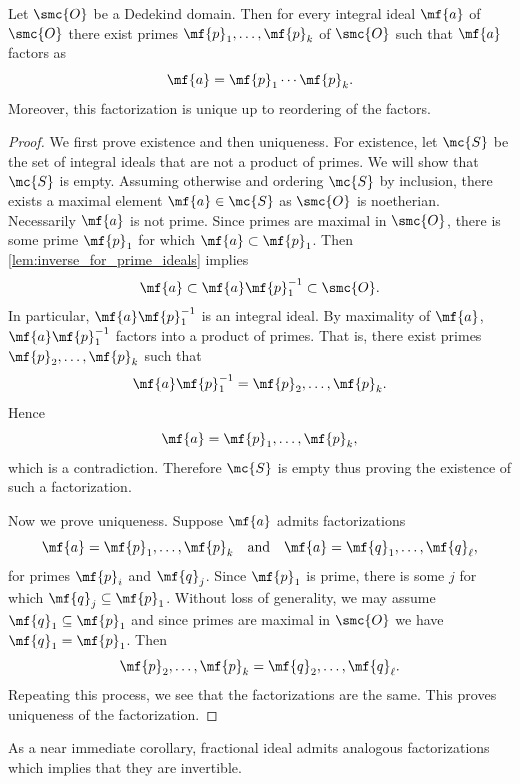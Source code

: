     \begin{theorem}\label{thm:unique_product_prime_ideals}
      Let \(\smc{O}\) be a Dedekind domain. Then for every integral ideal \(\mf{a}\) of \(\smc{O}\) there exist primes \(\mf{p}_{1},\ldots,\mf{p}_{k}\) of \(\smc{O}\) such that \(\mf{a}\) factors as
      \[
        \mf{a} = \mf{p}_{1} \cdots \mf{p}_{k}.
      \]
      Moreover, this factorization is unique up to reordering of the factors.
    \end{theorem}
    \begin{proof}
      We first prove existence and then uniqueness. For existence, let \(\mc{S}\) be the set of integral ideals that are not a product of primes. We will show that \(\mc{S}\) is empty. Assuming otherwise and ordering \(\mc{S}\) by inclusion, there exists a maximal element \(\mf{a} \in \mc{S}\) as \(\smc{O}\) is noetherian. Necessarily \(\mf{a}\) is not prime. Since primes are maximal in \(\smc{O}\), there is some prime \(\mf{p}_{1}\) for which \(\mf{a} \subset \mf{p}_{1}\). Then \cref{lem:inverse_for_prime_ideals} implies
      \[
        \mf{a} \subset \mf{a}\mf{p}_{1}^{-1} \subset \smc{O}.
      \]
      In particular, \(\mf{a}\mf{p}_{1}^{-1}\) is an integral ideal. By maximality of \(\mf{a}\), \(\mf{a}\mf{p}_{1}^{-1}\) factors into a product of primes. That is, there exist primes \(\mf{p}_{2},\ldots,\mf{p}_{k}\) such that
      \[
        \mf{a}\mf{p}_{1}^{-1} = \mf{p}_{2},\ldots,\mf{p}_{k}.
      \]
      Hence
      \[
        \mf{a} = \mf{p}_{1},\ldots,\mf{p}_{k},
      \]
      which is a contradiction. Therefore \(\mc{S}\) is empty thus proving the existence of such a factorization.
      
      Now we prove uniqueness. Suppose \(\mf{a}\) admits factorizations
      \[
        \mf{a} = \mf{p}_{1},\ldots,\mf{p}_{k} \quad \text{and} \quad \mf{a} = \mf{q}_{1},\ldots,\mf{q}_{\ell},
      \]
      for primes \(\mf{p}_{i}\) and \(\mf{q}_{j}\). Since \(\mf{p}_{1}\) is prime, there is some \(j\) for which \(\mf{q}_{j} \subseteq \mf{p}_{1}\). Without loss of generality, we may assume \(\mf{q}_{1} \subseteq \mf{p}_{1}\) and since primes are maximal in \(\smc{O}\) we have \(\mf{q}_{1} = \mf{p}_{1}\). Then
      \[
        \mf{p}_{2},\ldots,\mf{p}_{k} = \mf{q}_{2},\ldots,\mf{q}_{\ell}.
      \]
      Repeating this process, we see that the factorizations are the same. This proves uniqueness of the factorization.
    \end{proof}

    As a near immediate corollary, fractional ideal admits analogous factorizations which implies that they are invertible.

